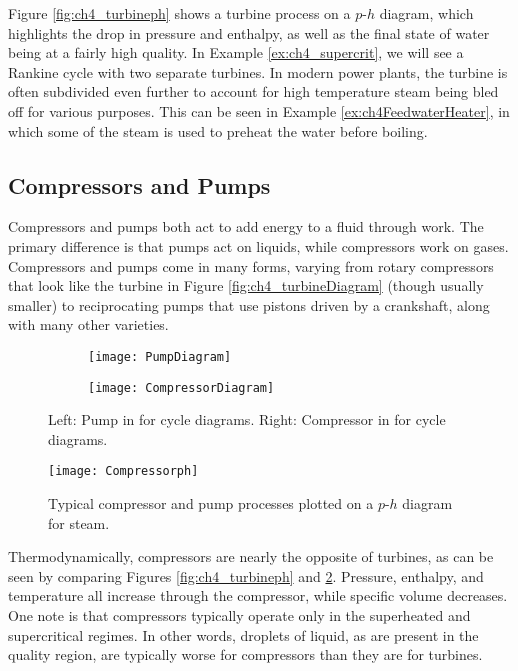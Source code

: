 Figure \ref{fig:ch4_turbineph} shows a turbine process on a $p$-$h$ diagram, which highlights the drop in pressure and enthalpy, as well as the final state of water being at a fairly high quality.  In Example \ref{ex:ch4_supercrit}, we will see a Rankine cycle with two separate turbines.  In modern power plants, the turbine is often subdivided even further to account for high temperature steam being bled off for various purposes.  This can be seen in Example \ref{ex:ch4FeedwaterHeater}, in which some of the steam is used to preheat the water before boiling.

\subsection{Compressors and Pumps} \label{sec:ch4_pumps}

Compressors and pumps both act to add energy to a fluid through work.  The primary difference is that pumps act on liquids, while compressors work on gases.  Compressors and pumps come in many forms, varying from rotary compressors that look like the turbine in Figure \ref{fig:ch4_turbineDiagram} (though usually smaller) to reciprocating pumps that use pistons driven by a crankshaft, along with many other varieties.


\begin{figure}[H]
  \centering
  \begin{subfigure}[b]{0.3\textwidth}
    \centering
    \texttt{[image: PumpDiagram]}
   
  \end{subfigure}
  \hspace{1 in}
  \begin{subfigure}[b]{0.3\textwidth}
    \centering
    \texttt{[image: CompressorDiagram]}
  \end{subfigure}
   \caption{Left: Pump in for cycle diagrams. Right: Compressor in for cycle diagrams.}
\label{fig:ch4_compressorDiagram}
\end{figure}

\begin{figure}[H]
\centering
\texttt{[image: Compressorph]}
\caption{Typical compressor and pump processes plotted on a $p$-$h$ diagram for steam.}
\label{fig:ch4_compressorph}
\end{figure}

Thermodynamically, compressors are nearly the opposite of turbines, as can be seen by comparing Figures \ref{fig:ch4_turbineph} and \ref{fig:ch4_compressorph}.  Pressure, enthalpy, and temperature all increase through the compressor, while specific volume decreases.  One note is that compressors typically operate only in the superheated and supercritical regimes.  In other words, droplets of liquid, as are present in the quality region, are typically worse for compressors than they are for turbines.


